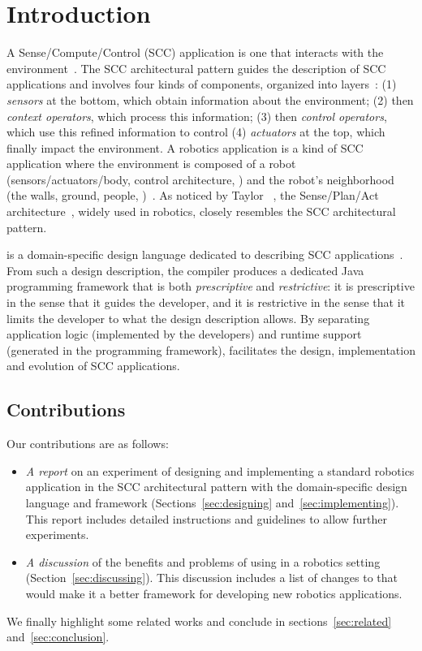 \section{Introduction}

A Sense/Compute/Control (SCC) application is one that interacts with
the environment~\cite{Tayl09a}. The SCC architectural pattern
guides the description of SCC applications and involves four kinds of
components, organized into layers~\cite{Cass11a,Edwar09a}: (1)
\emph{sensors} at the bottom, which obtain information about the
environment; (2) then \emph{context operators}, which process this
information; (3) then \emph{control operators}, which use this refined
information to control (4) \emph{actuators} at the top, which finally
impact the environment. A robotics application is a kind of SCC
application where the environment is composed of a robot
(sensors/actuators/body, control architecture, \etc{}) and the robot's
neighborhood (the walls, ground, people, \etc{})~\cite{Sicil08a}. As
noticed by Taylor \etal{}~\cite{Tayl09a}, the Sense/Plan/Act
architecture~\cite{Sicil08a}, widely used in robotics, closely
resembles the SCC architectural pattern.

\diaspec{} is a domain-specific design language dedicated to
describing SCC applications~\cite{Cass09b,Cass11a}. From such a design
description, the \diaspec{} compiler produces a dedicated Java
programming framework that is both \emph{prescriptive} and
\emph{restrictive}: it is prescriptive in the sense that it guides the
developer, and it is restrictive in the sense that it limits the
developer to what the design description allows. By separating
application logic (implemented by the developers) and runtime support
(generated in the programming framework), \diaspec{} facilitates the
design, implementation and evolution of SCC applications.


\subsection*{Contributions}

Our contributions are as follows:

\begin{itemize}
\item \emph{A report} on an experiment of designing and implementing a
  standard robotics application in the SCC architectural pattern with  the \diaspec{} domain-specific design language and framework
  (Sections~\ref{sec:designing} and~\ref{sec:implementing}). This
  report includes detailed instructions and guidelines to allow
  further experiments.
\item \emph{A discussion} of the benefits and problems of using
  \diaspec{} in a robotics setting (Section~\ref{sec:discussing}).
  This discussion includes a list of changes to \diaspec{} that would
  make it a better framework for developing new robotics applications.
\end{itemize}

We finally highlight some related works and conclude in
sections~\ref{sec:related} and~\ref{sec:conclusion}.




